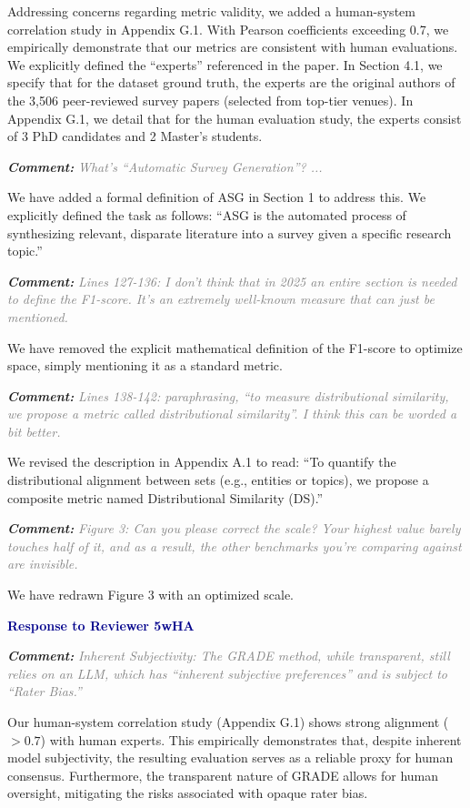 \documentclass[11pt, a4paper]{article}
\newcommand{\reviewer}[1]{\vspace{0.5cm}\noindent\textbf{\large \textcolor{darkblue}{#1}}}
\newcommand{\comment}[1]{%
    \par\vspace{1em}%
    \noindent\textbf{\textit{Comment:}} \textit{\textcolor{gray}{#1}}%
}
\begin{document}
Addressing concerns regarding metric validity, we added a human-system correlation study in Appendix G.1. With Pearson coefficients exceeding 0.7, we empirically demonstrate that our metrics are consistent with human evaluations. We explicitly defined the ``experts'' referenced in the paper. In Section 4.1, we specify that for the dataset ground truth, the experts are the original authors of the 3,506 peer-reviewed survey papers (selected from top-tier venues). In Appendix G.1, we detail that for the human evaluation study, the experts consist of 3 PhD candidates and 2 Master's students.

\comment{What's ``Automatic Survey Generation''? ...}

We have added a formal definition of ASG in Section 1 to address this. We explicitly defined the task as follows: ``ASG is the automated process of synthesizing relevant, disparate literature into a survey given a specific research topic.''

\comment{Lines 127-136: I don't think that in 2025 an entire section is needed to define the F1-score. It's an extremely well-known measure that can just be mentioned.}

We have removed the explicit mathematical definition of the F1-score to optimize space, simply mentioning it as a standard metric.

\comment{Lines 138-142: paraphrasing, ``to measure distributional similarity, we propose a metric called distributional similarity''. I think this can be worded a bit better.}

We revised the description in Appendix A.1 to read: ``To quantify the distributional alignment between sets (e.g., entities or topics), we propose a composite metric named Distributional Similarity (DS).''

\comment{Figure 3: Can you please correct the scale? Your highest value barely touches half of it, and as a result, the other benchmarks you're comparing against are invisible.}

We have redrawn Figure 3 with an optimized scale.

\reviewer{Response to Reviewer 5wHA}

\comment{Inherent Subjectivity: The GRADE method, while transparent, still relies on an LLM, which has ``inherent subjective preferences'' and is subject to ``Rater Bias.''}

Our human-system correlation study (Appendix G.1) shows strong alignment ($>0.7$) with human experts. This empirically demonstrates that, despite inherent model subjectivity, the resulting evaluation serves as a reliable proxy for human consensus. Furthermore, the transparent nature of GRADE allows for human oversight, mitigating the risks associated with opaque rater bias.
\end{document}
